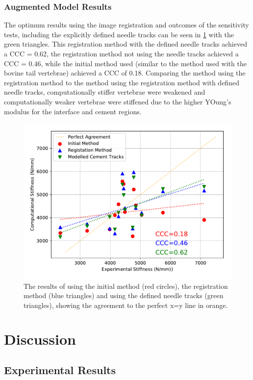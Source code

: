 \subsubsection{Augmented Model Results}

The optimum results using the image registration and outcomes of the
sensitivity tests, including the explicitly defined needle tracks can be seen
in \cref{fig:aug_init_vs_best} with the green triangles.  This registration
method with the defined needle tracks achieved a CCC = 0.62, the registration
method not using the needle tracks achieved a CCC = 0.46, while the initial
method used (similar to the method used with the bovine tail vertebrae)
achieved a CCC of 0.18. Comparing the method using the registration method to
the method using the registration method with defined needle tracks,
computationally stiffer vertebrae were weakened and computationally weaker
vertebrae were stiffened due to the higher YOung's modulus for the interface
and cement regions.

\begin{figure}[h!]
  \centering
	\includegraphics[width=.65\textwidth]{Chapters/Chapter_HT_images/aug_init_vs_best_vs_ndl_trcks}
	\caption{The results of using the initial method (red circles), the
registration method (blue triangles) and using the defined needle tracks (green
triangles), showing the agreement to the perfect x=y line in orange.}
	\label{fig:aug_init_vs_best}
\end{figure}


\section{Discussion}

\subsection{Experimental Results}

